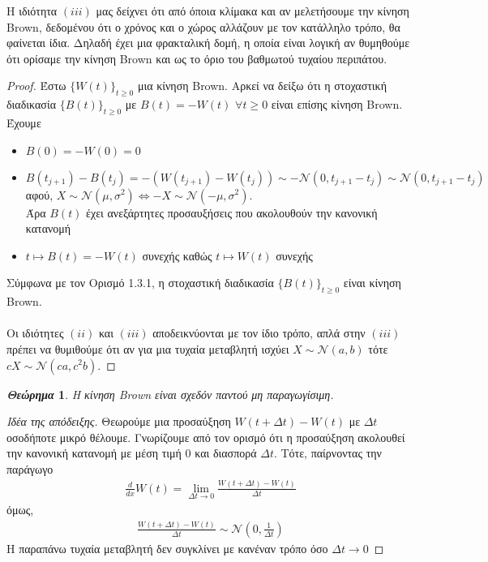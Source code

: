 \documentclass[12pt,a4paper,twoside,openany]{book}
\newtheorem{theorem}{\textit{Θεώρημα}}[section]
\begin{document}
		\noindent Η ιδιότητα $(iii)$ μας δείχνει ότι από όποια κλίμακα και αν μελετήσουμε την κίνηση Brown, δεδομένου ότι ο χρόνος και ο χώρος αλλάζουν με τον κατάλληλο τρόπο, θα φαίνεται ίδια. Δηλαδή έχει μια φρακταλική δομή, η οποία είναι λογική αν θυμηθούμε ότι ορίσαμε την κίνηση Brown και ως το όριο του βαθμωτού τυχαίου περιπάτου.
		\begin{proof}
			Έστω $\{W(t)\}_{t\geq0}$ μια κίνηση Brown. Αρκεί να δείξω ότι η στοχαστική διαδικασία $\{B(t)\}_{t\geq0}$ με $B(t)=-W(t)$ $\forall t\geq0$ είναι επίσης κίνηση Brown. Έχουμε
			\begin{itemize}
				\item $B(0)=-W(0)=0$
				\item $B(t_{j+1})-B(t_j)= -(W(t_{j+1})-W(t_j)) \sim -\mathcal{N}(0,t_{j+1}-t_j)\sim \mathcal{N}(0,t_{j+1}-t_j)$\\ 
				αφού, $X \sim \mathcal{N}(\mu, \sigma^2)\iff -X \sim \mathcal{N}(-\mu, \sigma^2)$.\\
				Άρα $B(t)$ έχει ανεξάρτητες προσαυξήσεις που ακολουθούν την κανονική κατανομή
				\item $t\mapsto B(t)=-W(t)$ συνεχής καθώς $t\mapsto W(t)$ συνεχής
			\end{itemize}
			Σύμφωνα με τον Ορισμό 1.3.1, η στοχαστική διαδικασία $\{B(t)\}_{t\geq0}$ είναι κίνηση Brown.\\\\
			Οι ιδιότητες $(ii)$ και $(iii)$ αποδεικνύονται με τον ίδιο τρόπο, απλά στην $(iii)$ πρέπει να θυμιθούμε ότι αν για μια τυχαία μεταβλητή ισχύει $X \sim \mathcal{N}(a, b)$ τότε $cX \sim \mathcal{N}(ca, c^2b)$.
		\end{proof}
	\vspace{2.5mm}
	
		\begin{theorem}
			Η κίνηση Brown είναι σχεδόν παντού μη παραγωγίσιμη.
		\end{theorem}
		\begin{proof}[Ιδέα της απόδειξης]
			Θεωρούμε μια προσαύξηση $W(t+\Delta t)-W(t)$ με $\Delta t$ οσοδήποτε μικρό θέλουμε. Γνωρίζουμε από τον ορισμό ότι η προσαύξηση ακολουθεί την κανονική κατανομή με μέση τιμή $0$ και διασπορά $\Delta t$. Τότε, παίρνοντας την παράγωγο
			\begin{align*}
				\frac{d}{dx}W(t) = \lim_{\Delta t\to 0} \frac{W(t+\Delta t)-W(t)}{\Delta t}
			\end{align*}
			όμως,
			\begin{align*}
				\frac{W(t+\Delta t)-W(t)}{\Delta t}\sim \mathcal{N}\left(0,\frac{1}{\Delta t}\right)
			\end{align*}
			Η παραπάνω τυχαία μεταβλητή δεν συγκλίνει με κανέναν τρόπο όσο $\Delta t\rightarrow0$ 
		\end{proof}
	
\end{document}

